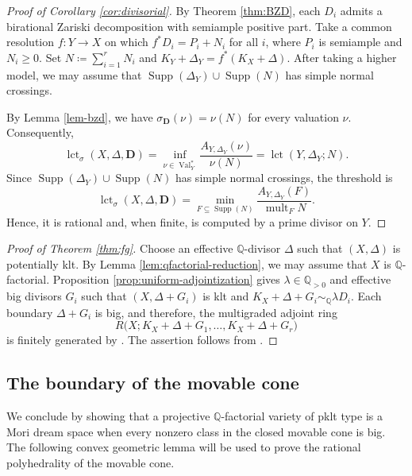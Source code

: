 \documentclass[a4paper,12pt]{amsart}
\theoremstyle{plain}
\theoremstyle{definition}
\numberwithin{equation}{section}
\newcommand{\Q}{\mathbb{Q}}
\DeclareMathOperator{\Val}{Val}
\def\mult{\operatorname{mult}}
\def\Supp{\operatorname{Supp}}
\def\lct{\operatorname{lct}}
\begin{document}
\begin{proof}[Proof of Corollary \ref{cor:divisorial}]
    By Theorem \ref{thm:BZD}, each \(D_i\) admits a birational Zariski decomposition with semiample positive part. Take a common resolution \(f\colon Y\to X\) on which $f^{\ast}D_i=P_i+N_i$
    for all \(i\), where \(P_i\) is semiample and \(N_i\geq 0\). Set $N\coloneqq \sum_{i=1}^r N_i$ and $K_Y+\Delta_Y=f^{\ast}(K_X+\Delta)$. After taking a higher model, we may assume that $\Supp(\Delta_Y)\cup \Supp(N)$ has simple normal crossings. 
    
    By Lemma \ref{lem-bzd}, we have \(\sigma_{\mathbf{D}}(\nu)=\nu(N)\) for every valuation \(\nu\). Consequently,
    \[
    \lct_{\sigma}(X,\Delta,\mathbf{D})=\inf_{\nu\in \Val_Y^{\ast}}\frac{A_{Y,\Delta_Y}(\nu)}{\nu(N)}=\lct(Y,\Delta_Y;N).
    \]
    Since $\Supp(\Delta_Y)\cup\Supp(N)$ has simple normal crossings, the threshold is
    \[
    \lct_{\sigma}(X,\Delta,\mathbf D)=\min_{F\subseteq\Supp(N)}\frac{A_{Y,\Delta_Y}(F)}{\mult_F N}.
    \]
    Hence, it is rational and, when finite, is computed by a prime divisor on $Y$.
\end{proof}

\begin{proof}[Proof of Theorem \ref{thm:fg}]
Choose an effective $\Q$-divisor \(\Delta\) such that \((X,\Delta)\) is potentially klt. By Lemma \ref{lem:qfactorial-reduction}, we may assume that $X$ is $\Q$-factorial. Proposition \ref{prop:uniform-adjointization} gives $\lambda\in\Q_{>0}$ and effective big divisors $G_i$ such that $(X,\Delta+G_i)$ is klt and $K_X+\Delta+G_i\sim_{\Q}\lambda D_i$. Each boundary $\Delta+G_i$ is big, and therefore, the multigraded adjoint ring
\[
R\bigl(X;K_X+\Delta+G_1,\dots,K_X+\Delta+G_r\bigr)
\]
is finitely generated by \cite[Theorem 3.5(2)]{KKL}. The assertion follows from \cite[Lemma 3.1]{KKL}.
\end{proof}

\subsection{The boundary of the movable cone}
We conclude by showing that a projective $\Q$-factorial variety of pklt type is a Mori dream space when every nonzero class in the closed movable cone is big. The following convex geometric lemma will be used to prove the rational polyhedrality of the movable cone.
\end{document}
